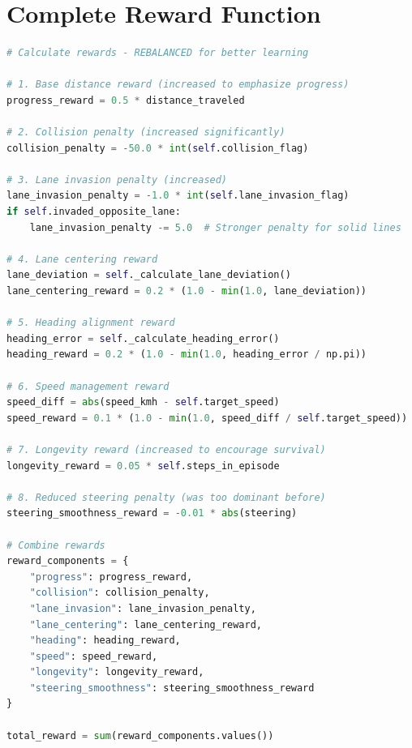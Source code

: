 \documentclass[11pt,a4paper]{article}
\begin{document}
\section{Complete Reward Function}
\begin{lstlisting}[language=Python,caption=Complete Enhanced Reward Function]
# Calculate rewards - REBALANCED for better learning

# 1. Base distance reward (increased to emphasize progress)
progress_reward = 0.5 * distance_traveled

# 2. Collision penalty (increased significantly)
collision_penalty = -50.0 * int(self.collision_flag)

# 3. Lane invasion penalty (increased)
lane_invasion_penalty = -1.0 * int(self.lane_invasion_flag)
if self.invaded_opposite_lane:
    lane_invasion_penalty -= 5.0  # Stronger penalty for solid lines

# 4. Lane centering reward
lane_deviation = self._calculate_lane_deviation()
lane_centering_reward = 0.2 * (1.0 - min(1.0, lane_deviation))

# 5. Heading alignment reward
heading_error = self._calculate_heading_error()
heading_reward = 0.2 * (1.0 - min(1.0, heading_error / np.pi))

# 6. Speed management reward
speed_diff = abs(speed_kmh - self.target_speed)
speed_reward = 0.1 * (1.0 - min(1.0, speed_diff / self.target_speed))

# 7. Longevity reward (increased to encourage survival)
longevity_reward = 0.05 * self.steps_in_episode

# 8. Reduced steering penalty (was too dominant before)
steering_smoothness_reward = -0.01 * abs(steering)

# Combine rewards
reward_components = {
    "progress": progress_reward,
    "collision": collision_penalty,
    "lane_invasion": lane_invasion_penalty,
    "lane_centering": lane_centering_reward,
    "heading": heading_reward,
    "speed": speed_reward,
    "longevity": longevity_reward, 
    "steering_smoothness": steering_smoothness_reward
}

total_reward = sum(reward_components.values())
\end{lstlisting}
\end{document}
